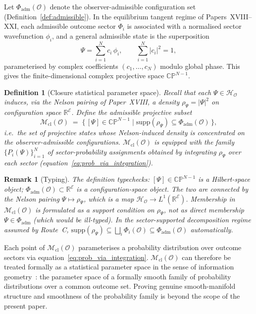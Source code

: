 \documentclass[12pt]{article}
\newtheorem{definition}[theorem]{Definition}
\newtheorem{remark}[theorem]{Remark}
\newcommand{\Ecal}{\mathcal{E}}
\newcommand{\Ocal}{\mathcal{O}}
\newcommand{\Hcal}{\mathcal{H}}
\newcommand{\Mcl}{\mathcal{M}_{\mathrm{cl}}}
\begin{document}
Let $\Phi_{\mathrm{adm}}(\Ocal)$ denote the observer-admissible configuration set (Definition~\ref{def:admissible}). In the equilibrium tangent regime of Papers~XVIII--XXI, each admissible outcome sector $\Phi_i$ is associated with a normalised sector wavefunction $\phi_i$, and a general admissible state is the superposition
\begin{equation}
    \Psi = \sum_{i=1}^{N} c_i\, \phi_i, \qquad \sum_{i=1}^{N} |c_i|^2 = 1,
\end{equation}
parameterised by complex coefficients $(c_1, \ldots, c_N)$ modulo global phase. This gives the finite-dimensional complex projective space $\mathbb{CP}^{N-1}$.

\begin{definition}[Closure statistical parameter space]\label{def:closure_manifold}
Recall that each $\Psi \in \Hcal_\Ocal$ induces, via the Nelson pairing of Paper~XVIII, a density $\rho_\Psi = |\Psi|^2$ on configuration space $\mathbb{R}^\Ecal$. Define the admissible projective subset
\begin{equation}
    \Mcl(\Ocal) \;=\; \bigl\{\, [\Psi] \in \mathbb{CP}^{N-1} \;\big|\; \mathrm{supp}(\rho_\Psi) \subseteq \Phi_{\mathrm{adm}}(\Ocal) \,\bigr\},
\end{equation}
i.e.\ the set of projective states whose Nelson-induced density is concentrated on the observer-admissible configurations. $\Mcl(\Ocal)$ is equipped with the family $\{P_i(\Psi)\}_{i=1}^{N}$ of sector-probability assignments obtained by integrating $\rho_\Psi$ over each sector (equation~\eqref{eq:prob_via_integration}).
\end{definition}

\begin{remark}[Typing]\label{rem:typing}
The definition typechecks: $[\Psi] \in \mathbb{CP}^{N-1}$ is a Hilbert-space object; $\Phi_{\mathrm{adm}}(\Ocal) \subset \mathbb{R}^\Ecal$ is a configuration-space object. The two are connected by the Nelson pairing $\Psi \mapsto \rho_\Psi$, which is a map $\Hcal_\Ocal \to L^1(\mathbb{R}^\Ecal)$. Membership in $\Mcl(\Ocal)$ is formulated as a support condition on $\rho_\Psi$, not as direct membership $\Psi \in \Phi_{\mathrm{adm}}$ (which would be ill-typed). In the sector-supported decomposition regime assumed by Route~C, $\mathrm{supp}(\rho_\Psi) \subseteq \bigsqcup_i \Phi_i(\Ocal) \subseteq \Phi_{\mathrm{adm}}(\Ocal)$ automatically.
\end{remark}

Each point of $\Mcl(\Ocal)$ parameterises a probability distribution over outcome sectors via equation~\eqref{eq:prob_via_integration}. $\Mcl(\Ocal)$ can therefore be treated formally as a statistical parameter space in the sense of information geometry~\citep{AmariNagaoka2000}: the parameter space of a formally smooth family of probability distributions over a common outcome set. Proving genuine smooth-manifold structure and smoothness of the probability family is beyond the scope of the present paper.
\end{document}
